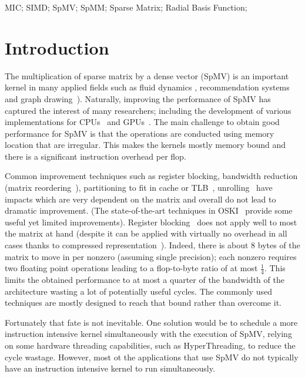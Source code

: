 \documentclass[10pt,conference,compsocconf]{IEEEtran}
\begin{document}
\begin{IEEEkeywords}
MIC; SIMD; SpMV; SpMM; Sparse Matrix; Radial Basis Function;
\end{IEEEkeywords}

\IEEEpeerreviewmaketitle

\section{Introduction}
The multiplication of sparse matrix by a dense vector (SpMV) is an
important kernel in many applied fields such as fluid dynamics 
\cite{journals/tog/BolzFGS03}, recommendation systems~\cite{Brin98} and graph
drawing~\cite{Koren05}). Naturally, improving the performance of SpMV has
captured the interest of many researchers; including the development of
various implementations for 
CPUs~\cite{Buluc2009SPAA,Williams07} and GPUs~\cite{Bell08,
  conf/ipps/KreutzerHWFBB12,
  journals/concurrency/VazquezFG11,kumar2012accelerating}. The main
challenge  to obtain good performance for SpMV is that
the operations are conducted using memory location that are irregular. This makes the kernels mostly memory
bound and there is a significant instruction overhead per flop.

Common improvement techniques such as register blocking, bandwidth
reduction (matrix reordering~\cite{Cuthill69}), partitioning to fit in
cache or TLB~\cite{Nishtala07,Temam:1992:CBS:147877.148091,conf/ppsc/Toledo97},
unrolling~\cite{Mellor-Crummey04} have impacts which are very
dependent on the matrix and overall do not lead to dramatic
improvement. (The state-of-the-art techniques in OSKI~\cite{Vuduc05}
provide some useful yet limited improvements). Register blocking~\cite{conf/ppsc/Toledo97} does
not apply well to most the matrix at hand (despite it can be applied
with virtually no overhead in all cases thanks to compressed
representation~\cite{Buluc11}). Indeed, there is about 8 bytes of the matrix to move
in per nonzero (assuming single precision); each nonzero requires two
floating point operations leading to a flop-to-byte ratio of at most
$\frac{1}{4}$. This limits the obtained performance to at most a
quarter of the bandwidth of the architecture wasting a lot of
potentially useful cycles. The commonly used techniques are mostly
designed to reach that bound rather than overcome it.

Fortunately that fate is not inevitable. One solution would be to
schedule a more instruction intensive kernel simultaneously with the
execution of SpMV, relying on some hardware threading capabilities,
such as HyperThreading, to reduce the cycle wastage. However, most ot
the applications that use SpMV do not typically have an instruction
intensive kernel to run simultaneously.
\end{document}
